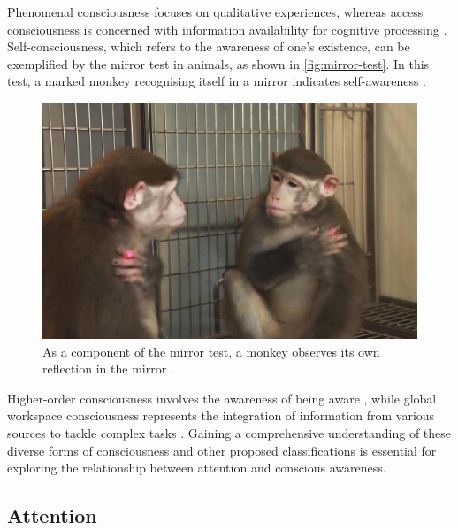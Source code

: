 \documentclass[10pt]{article}
\begin{document}
\begin{sloppypar}
  \newpage

  Phenomenal consciousness focuses on qualitative experiences, whereas access consciousness is concerned with information availability for cognitive processing \citep{aru_phenomenal_2013,block_two_2005}. Self-consciousness, which refers to the awareness of one’s existence, can be exemplified by the mirror test in animals, as shown in \autoref{fig:mirror-test}. In this test, a marked monkey recognising itself in a mirror indicates self-awareness \citep{chang_mirror-induced_2015}.

  \begin{figure}[ht]
    \centering
    \includegraphics[width=\textwidth]{figures/mirror.jpg}
    \caption[As a component of the mirror test, a monkey observes its own reflection in the mirror
    ]{As a component of the mirror test, a monkey observes its own reflection in the mirror \citep{chang_mirror-induced_2015}.}
    \label{fig:mirror-test}
  \end{figure}

  Higher-order consciousness involves the awareness of being aware \citep{carruthers_higher-order_2020}, while global workspace consciousness represents the integration of information from various sources to tackle complex tasks \citep{baars_essential_1997}. Gaining a comprehensive understanding of these diverse forms of consciousness and other proposed classifications is essential for exploring the relationship between attention and conscious awareness.

  \subsection{Attention}
  \label{sec:attention}


\end{sloppypar}
\end{document}

